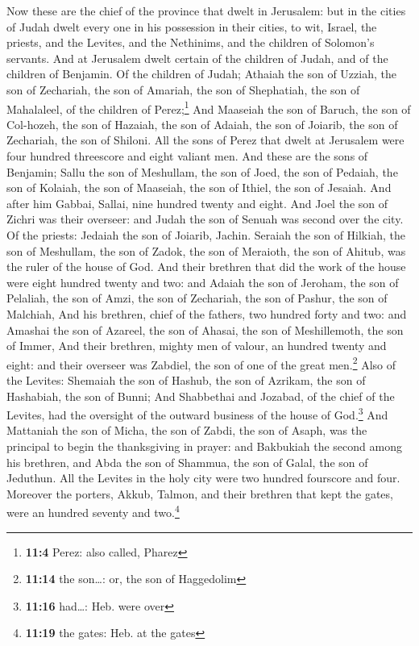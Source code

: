  Now these are the chief of the province that dwelt in
Jerusalem: but in the cities of Judah dwelt every one in his possession
in their cities, to wit, Israel, the priests, and the Levites, and the
Nethinims, and the children of Solomon's servants.  And at
Jerusalem dwelt certain of the children of Judah, and of the children of
Benjamin. Of the children of Judah; Athaiah the son of Uzziah, the son
of Zechariah, the son of Amariah, the son of Shephatiah, the son of
Mahalaleel, of the children of Perez;\footnote{\textbf{11:4} Perez: also
  called, Pharez}  And Maaseiah the son of Baruch, the son
of Col-hozeh, the son of Hazaiah, the son of Adaiah, the son of Joiarib,
the son of Zechariah, the son of Shiloni.  All the sons of
Perez that dwelt at Jerusalem were four hundred threescore and eight
valiant men.  And these are the sons of Benjamin; Sallu
the son of Meshullam, the son of Joed, the son of Pedaiah, the son of
Kolaiah, the son of Maaseiah, the son of Ithiel, the son of Jesaiah.
 And after him Gabbai, Sallai, nine hundred twenty and
eight.  And Joel the son of Zichri was their overseer: and
Judah the son of Senuah was second over the city.  Of the
priests: Jedaiah the son of Joiarib, Jachin.  Seraiah the
son of Hilkiah, the son of Meshullam, the son of Zadok, the son of
Meraioth, the son of Ahitub, was the ruler of the house of God.
 And their brethren that did the work of the house were
eight hundred twenty and two: and Adaiah the son of Jeroham, the son of
Pelaliah, the son of Amzi, the son of Zechariah, the son of Pashur, the
son of Malchiah,  And his brethren, chief of the fathers,
two hundred forty and two: and Amashai the son of Azareel, the son of
Ahasai, the son of Meshillemoth, the son of Immer,  And
their brethren, mighty men of valour, an hundred twenty and eight: and
their overseer was Zabdiel, the son of one of the great men.\footnote{\textbf{11:14}
  the son\ldots: or, the son of Haggedolim}  Also of the
Levites: Shemaiah the son of Hashub, the son of Azrikam, the son of
Hashabiah, the son of Bunni;  And Shabbethai and Jozabad,
of the chief of the Levites, had the oversight of the outward business
of the house of God.\footnote{\textbf{11:16} had\ldots: Heb. were over}
 And Mattaniah the son of Micha, the son of Zabdi, the
son of Asaph, was the principal to begin the thanksgiving in prayer: and
Bakbukiah the second among his brethren, and Abda the son of Shammua,
the son of Galal, the son of Jeduthun.  All the Levites
in the holy city were two hundred fourscore and four. 
Moreover the porters, Akkub, Talmon, and their brethren that kept the
gates, were an hundred seventy and two.\footnote{\textbf{11:19} the
  gates: Heb. at the gates}

